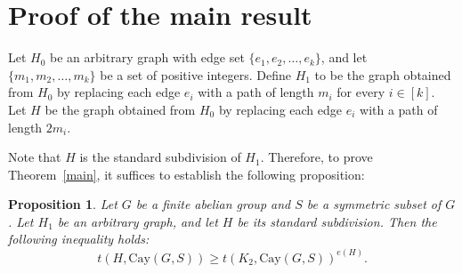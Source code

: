 \documentclass[12pt,a4paper]{article}
\theoremstyle{definition}
\theoremstyle{plain}
\newtheorem{prop}[theorem]{Proposition}
\theoremstyle{definition}
\begin{document}
\section{Proof of the main result}
Let $H_0$ be an arbitrary graph with edge set $\{e_1, e_2, \dots, e_k\}$, and let $\{m_1, m_2, \dots, m_k\}$ be a set of positive integers. Define $H_1$ to be the graph obtained from $H_0$ by replacing each edge $e_i$ with a path of length $m_i$ for every $i \in [k]$. Let $H$ be the graph obtained from $H_0$ by replacing each edge $e_i$ with a path of length $2m_i$. 

Note that $H$ is the standard subdivision of $H_1$. Therefore, to prove Theorem~\ref{main}, it suffices to establish the following proposition:

\begin{prop}
Let $G$ be a finite abelian group and $S$ be a symmetric subset of $G$. Let $H_1$ be an arbitrary graph, and let $H$ be its standard subdivision. Then the following inequality holds:
\[
        t(H,\mathrm{Cay}(G, S))\geq t(K_2,\mathrm{Cay}(G, S))^{e(H)}.
\]
\end{prop}
\end{document}
